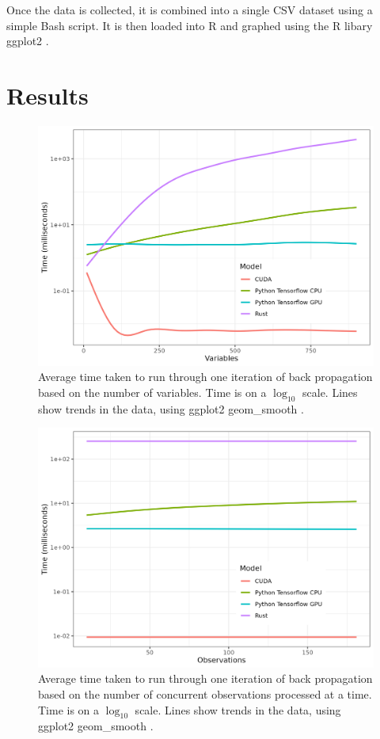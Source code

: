 \documentclass[12pt]{article}
\begin{document}
Once the data is collected, it is combined into a single CSV dataset using a simple Bash script.
It is then loaded into R \cite{lang_r} and graphed using the R libary ggplot2 \cite{lib_ggplot2}.

\section{Results}

\begin{figure}
	\begin{center}
		\includegraphics[width=0.9\linewidth]{variables.png}
	\end{center}
	\caption{Average time taken to run through one iteration of back propagation based on the number of variables. Time is on a $\log_{10}$ scale. Lines show trends in the data, using ggplot2 geom\_smooth \cite{lib_ggplot2}.}
	\label{fig:graph:variables}
\end{figure}

\begin{figure}
	\begin{center}
		\includegraphics[width=0.9\linewidth]{bootstraps.png}
	\end{center}
	\caption{Average time taken to run through one iteration of back propagation based on the number of concurrent observations processed at a time. Time is on a $\log_{10}$ scale. Lines show trends in the data, using ggplot2 geom\_smooth \cite{lib_ggplot2}.}
	\label{fig:graph:observations}
\end{figure}
\end{document}
